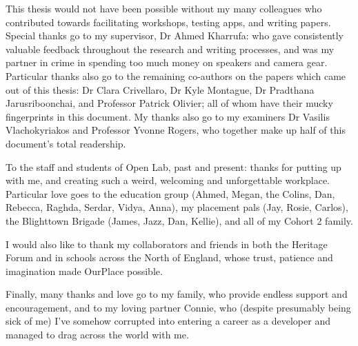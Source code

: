 
\begin{dedication} 

This thesis would not have been possible without my many colleagues who contributed towards facilitating workshops, testing apps, and writing papers. Special thanks go to my supervisor, Dr Ahmed Kharrufa: who gave consistently valuable feedback throughout the research and writing processes, and was my partner in crime in spending too much money on speakers and camera gear. Particular thanks also go to the remaining co-authors on the papers which came out of this thesis: Dr Clara Crivellaro, Dr Kyle Montague, Dr Pradthana Jarusriboonchai, and Professor Patrick Olivier; all of whom have their mucky fingerprints in this document. My thanks also go to my examiners Dr Vasilis Vlachokyriakos and Professor Yvonne Rogers, who together make up half of this document's total readership.

To the staff and students of Open Lab, past and present: thanks for putting up with me, and creating such a weird, welcoming and unforgettable workplace. Particular love goes to the education group (Ahmed, Megan, the Colins, Dan, Rebecca, Raghda, Serdar, Vidya, Anna), my placement pals (Jay, Rosie, Carlos), the Blighttown Brigade (James, Jazz, Dan, Kellie), and all of my Cohort 2 family.

I would also like to thank my collaborators and friends in both the Heritage Forum and in schools across the North of England, whose trust, patience and imagination made OurPlace possible.

Finally, many thanks and love go to my family, who provide endless support and encouragement, and to my loving partner Connie, who (despite presumably being sick of me) I've somehow corrupted into entering a career as a developer and managed to drag across the world with me.

\end{dedication}

